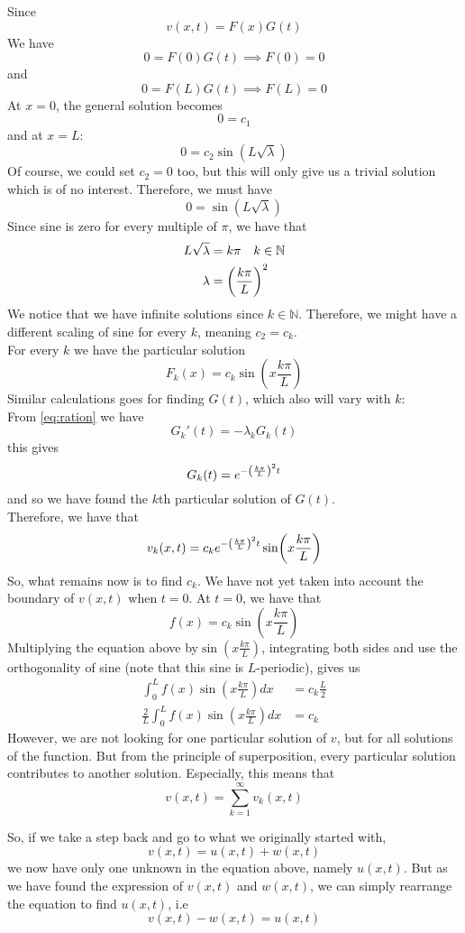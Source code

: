 \documentclass[12pt,english,a4paper]{article}
\begin{document}
Since 
\[
v(x,t) = F(x)G(t)
\]
We have
\[
0 = F(0)G(t) \implies F(0) = 0
\]
and 
\[
0 = F(L)G(t) \implies F(L) = 0
\]
At \(x = 0\), the general solution becomes
\[
0 = c_1
\]
and at \(x = L\):
\[
0 =  c_2\sin(L\sqrt{\lambda})
\]
Of course, we could set \(c_2 = 0\) too, but this will only give us a trivial solution which is of no interest. Therefore, we must have 
\[
0 = \sin(L\sqrt{\lambda})
\]
Since sine is zero for every multiple of \(\pi\), we have that
\begin{align*}
L\sqrt{\lambda} &= k\pi \quad k\in \mathbb{N}\\
\lambda &= \qty(\frac{k \pi}{L})^2
\end{align*}
We notice that we have infinite solutions since \(k \in \mathbb{N}\). Therefore, we might have a different scaling of sine for every \(k\), meaning \(c_2 = c_k\).\\  For every \(k\) we have the particular solution 
\[
F_k(x) = c_k\sin(x\frac{k \pi}{L})
\]
Similar calculations goes for finding \(G(t)\), which also will vary with \(k\):\\
From \vref{eq:ration} we have
\[
G_k'(t) = -\lambda_k G_k(t)
\]
this gives
\[
G_k(t) = e^{-\qty(\frac{k \pi}{L})^2t}
\]
and so we have found the \(k\)th particular solution of \(G(t)\). \\
Therefore, we have that 
\[
v_k(x,t) = c_ke^{-\qty(\frac{k \pi}{L})^2t}\sin(x\frac{k \pi}{L})
\]
So, what remains now is to find \(c_k\). We have not yet taken into account the boundary of \(v(x,t)\) when \(t = 0\). At \(t = 0\), we have that
\[
f(x) = c_k\sin(x\frac{k \pi}{L})
\]
Multiplying  the equation above by\(\sin(x\frac{k \pi}{L})\), integrating both sides and use the orthogonality of sine (note that this sine is \(L\)-periodic), gives us
\begin{align*}
\int_0^Lf(x)\sin(x\frac{k \pi}{L})dx &= c_k\frac{L}{2} \\
\frac{2}{L}\int_0^Lf(x)\sin(x\frac{k \pi}{L})dx &= c_k
\end{align*}
However, we are not looking for one particular solution of \(v\), but for all solutions of the function. But from the principle of superposition, every particular solution contributes to another solution. Especially, this means that
\[
v(x,t) = \sum_{k=1}^\infty v_k(x,t)
\]

So, if we take a step back and go to what we originally started with, 
\[
v(x,t) = u(x,t) + w(x,t)
\]
we now have only one unknown in the equation above, namely \(u(x,t)\). But as we have found the expression of \(v(x,t)\) and \(w(x,t)\), we can simply rearrange the equation to find \(u(x,t)\), i.e
\[
v(x,t)- w(x,t) = u(x,t)
\]
\end{document}
